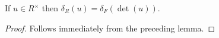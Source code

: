   \begin{lemma}
  \label{distribHaarChar_algebra}
  If $u\in R^\times$ then $\delta_R(u)=\delta_F(\det(u))$.
\end{lemma}
\begin{proof}
  Follows immediately from the preceding lemma.
\end{proof}





